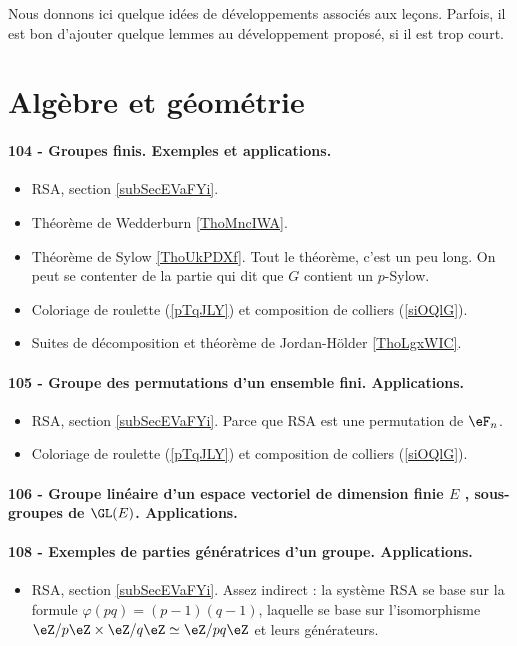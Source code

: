 Nous donnons ici quelque idées de développements associés aux leçons. Parfois, il est bon d'ajouter quelque lemmes au développement proposé, si il est trop court.

\section{Algèbre et géométrie}

\paragraph{104 - Groupes finis. Exemples et applications.}
\begin{itemize}
    \item RSA, section \ref{subSecEVaFYi}.
    \item Théorème de Wedderburn \ref{ThoMncIWA}.
    \item Théorème de Sylow \ref{ThoUkPDXf}. Tout le théorème, c'est un peu long. On peut se contenter de la partie qui dit que \( G\) contient un \( p\)-Sylow.
    \item Coloriage de roulette (\ref{pTqJLY}) et composition de colliers (\ref{siOQlG}).
    \item Suites de décomposition et théorème de Jordan-Hölder \ref{ThoLgxWIC}.
\end{itemize}
\paragraph{105 - Groupe des permutations d’un ensemble fini. Applications.}
\begin{itemize}
    \item RSA, section \ref{subSecEVaFYi}. Parce que RSA est une permutation de \( \eF_n\).
    \item Coloriage de roulette (\ref{pTqJLY}) et composition de colliers (\ref{siOQlG}).
\end{itemize}
\paragraph{106 - Groupe linéaire d’un espace vectoriel de dimension finie $E$ , sous-groupes de $\GL(E)$. Applications.}
\paragraph{108 - Exemples de parties génératrices d’un groupe. Applications.}
\begin{itemize}
    \item RSA, section \ref{subSecEVaFYi}. Assez indirect : la système RSA se base sur la formule \( \varphi(pq)=(p-1)(q-1)\), laquelle se base sur l'isomorphisme \( \eZ/p\eZ\times \eZ/q\eZ\simeq \eZ/pq\eZ\) et leurs générateurs.
\end{itemize}
